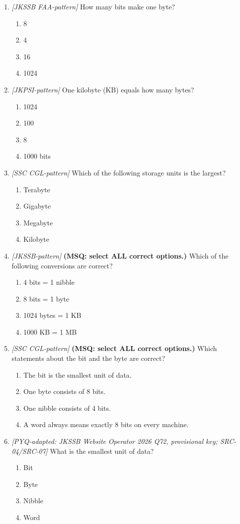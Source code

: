 \begin{enumerate}[label=\textbf{Q\arabic*.}, leftmargin=*]
\item \textit{[JKSSB FAA-pattern]} How many bits make one byte?
  \begin{enumerate}[label=\Alph*.]
    \item 8
    \item 4
    \item 16
    \item 1024
  \end{enumerate}
\item \textit{[JKPSI-pattern]} One kilobyte (KB) equals how many bytes?
  \begin{enumerate}[label=\Alph*.]
    \item 1024
    \item 100
    \item 8
    \item 1000 bits
  \end{enumerate}
\item \textit{[SSC CGL-pattern]} Which of the following storage units is the largest?
  \begin{enumerate}[label=\Alph*.]
    \item Terabyte
    \item Gigabyte
    \item Megabyte
    \item Kilobyte
  \end{enumerate}
\item \textit{[JKSSB-pattern]} \textbf{(MSQ: select ALL correct options.)} Which of the following conversions are correct?
  \begin{enumerate}[label=\Alph*.]
    \item 4 bits = 1 nibble
    \item 8 bits = 1 byte
    \item 1024 bytes = 1 KB
    \item 1000 KB = 1 MB
  \end{enumerate}
\item \textit{[SSC CGL-pattern]} \textbf{(MSQ: select ALL correct options.)} Which statements about the bit and the byte are correct?
  \begin{enumerate}[label=\Alph*.]
    \item The bit is the smallest unit of data.
    \item One byte consists of 8 bits.
    \item One nibble consists of 4 bits.
    \item A word always means exactly 8 bits on every machine.
  \end{enumerate}
\item \textit{[PYQ-adapted: JKSSB Website Operator 2026 Q72, provisional key; SRC-04/SRC-07]} What is the smallest unit of data?
  \begin{enumerate}[label=\Alph*.]
\item Bit
   \item Byte
   \item Nibble
   \item Word
  \end{enumerate}


\end{enumerate}
